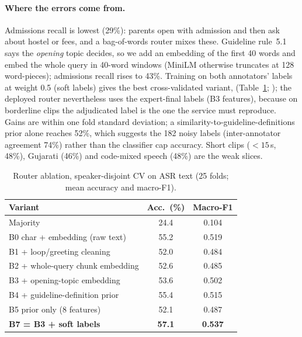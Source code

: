 \documentclass[sigconf,authordraft]{acmart}
\begin{document}
\paragraph{Where the errors come from.}
Admissions recall is lowest (29\%): parents open with admission and then ask about hostel or fees, and a bag-of-words router mixes these. Guideline rule~5.1 says the \emph{opening} topic decides, so we add an embedding of the first 40 words and embed the whole query in 40-word windows (MiniLM otherwise truncates at 128 word-pieces); admissions recall rises to 43\%. Training on both annotators' labels at weight 0.5 (soft labels) gives the best cross-validated variant, \SpkBest{} (Table~\ref{tab:v2}; ); the deployed router nevertheless uses the expert-final labels (B3 features), because on borderline clips the adjudicated label is the one the service must reproduce. Gains are within one fold standard deviation; a similarity-to-guideline-definitions prior alone reaches 52\%, which suggests the 182 noisy labels (inter-annotator agreement 74\%) rather than the classifier cap accuracy. Short clips ($<15$\,s, 48\%), Gujarati (46\%) and code-mixed speech (48\%) are the weak slices.
\begin{table}[htbp]
\caption{Router ablation, speaker-disjoint CV on ASR text (25 folds; mean accuracy and macro-F1).}\label{tab:v2}
\small\begin{tabular}{lcc}
\toprule Variant & Acc.\ (\%) & Macro-F1 \\ \midrule
Majority & 24.4 & 0.104 \\
B0 char + embedding (raw text) & 55.2 & 0.519 \\
B1 + loop/greeting cleaning & 52.0 & 0.484 \\
B2 + whole-query chunk embedding & 52.6 & 0.485 \\
B3 + opening-topic embedding & 53.6 & 0.502 \\
B4 + guideline-definition prior & 55.4 & 0.515 \\
B5 prior only (8 features) & 52.1 & 0.487 \\
\textbf{B7 = B3 + soft labels} & \textbf{57.1} & \textbf{0.537} \\ \bottomrule
\end{tabular}
\end{table}
\end{document}
